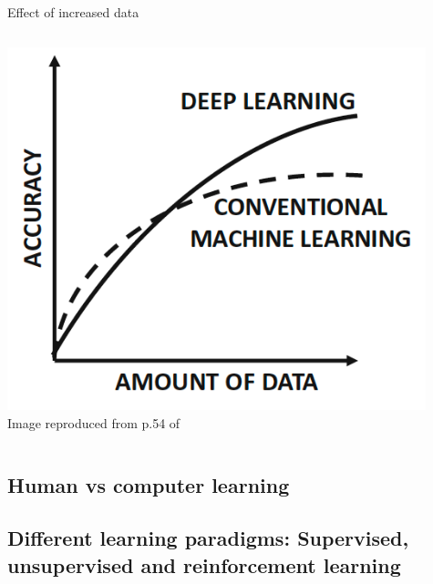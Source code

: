 \begin{frame}[t]{Effect of increased data}

    \begin{columns}
        \begin{column}{0.50\textwidth}
         \begin{center}
          \includegraphics[width=0.95\textwidth]{./images/dl_intro/accuracy_vs_amount_of_data_1.png}\\
          {\scriptsize \color{col:attribution} 
          Image reproduced from p.54 of \cite{Aggarwal:2018SpringerDL}}\\
         \end{center}
        \end{column}
        \begin{column}{0.50\textwidth}
        \end{column}
    \end{columns}


\end{frame}


\subsection{Human vs computer learning}

\subsection{Different learning paradigms: Supervised, unsupervised and reinforcement learning}

